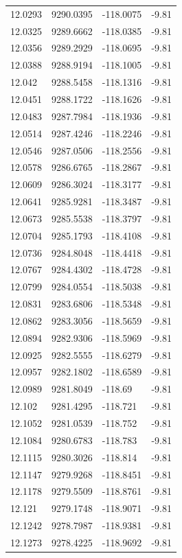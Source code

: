 \begin{table}[H]
\begin{tabular}{llll}
12.0293 & 9290.0395 & -118.0075 & -9.81 \\
12.0325 & 9289.6662 & -118.0385 & -9.81 \\
12.0356 & 9289.2929 & -118.0695 & -9.81 \\
12.0388 & 9288.9194 & -118.1005 & -9.81 \\
12.042 & 9288.5458 & -118.1316 & -9.81 \\
12.0451 & 9288.1722 & -118.1626 & -9.81 \\
12.0483 & 9287.7984 & -118.1936 & -9.81 \\
12.0514 & 9287.4246 & -118.2246 & -9.81 \\
12.0546 & 9287.0506 & -118.2556 & -9.81 \\
12.0578 & 9286.6765 & -118.2867 & -9.81 \\
12.0609 & 9286.3024 & -118.3177 & -9.81 \\
12.0641 & 9285.9281 & -118.3487 & -9.81 \\
12.0673 & 9285.5538 & -118.3797 & -9.81 \\
12.0704 & 9285.1793 & -118.4108 & -9.81 \\
12.0736 & 9284.8048 & -118.4418 & -9.81 \\
12.0767 & 9284.4302 & -118.4728 & -9.81 \\
12.0799 & 9284.0554 & -118.5038 & -9.81 \\
12.0831 & 9283.6806 & -118.5348 & -9.81 \\
12.0862 & 9283.3056 & -118.5659 & -9.81 \\
12.0894 & 9282.9306 & -118.5969 & -9.81 \\
12.0925 & 9282.5555 & -118.6279 & -9.81 \\
12.0957 & 9282.1802 & -118.6589 & -9.81 \\
12.0989 & 9281.8049 & -118.69 & -9.81 \\
12.102 & 9281.4295 & -118.721 & -9.81 \\
12.1052 & 9281.0539 & -118.752 & -9.81 \\
12.1084 & 9280.6783 & -118.783 & -9.81 \\
12.1115 & 9280.3026 & -118.814 & -9.81 \\
12.1147 & 9279.9268 & -118.8451 & -9.81 \\
12.1178 & 9279.5509 & -118.8761 & -9.81 \\
12.121 & 9279.1748 & -118.9071 & -9.81 \\
12.1242 & 9278.7987 & -118.9381 & -9.81 \\
12.1273 & 9278.4225 & -118.9692 & -9.81 \\

\end{tabular}
\end{table}
